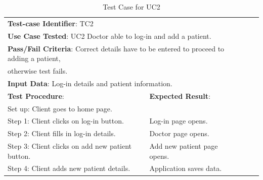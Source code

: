 \documentclass[a4paper]{article}
\begin{document}
\begin{table}[h!]
\centering
\caption*{Test Case for UC2}
\label{TC2}
\begin{tabular}{lllll}
\cline{1-2}

\multicolumn{2}{|l|}{\textbf{Test-case Identifier}: TC2}  &  &  &  \\

\multicolumn{2}{|l|}{\textbf{Use Case Tested}: UC2 Doctor able to log-in and add a patient.}  &  &  &  \\

\multicolumn{2}{|l|}{\textbf{Pass/Fail Criteria}: Correct details have to be entered to proceed to adding a patient,}  &  &  &  \\

\multicolumn{2}{|l|}{otherwise test fails.}  &  &  &  \\

\multicolumn{2}{|l|}{\textbf{Input Data}: Log-in details and patient information.}  &  &  &  \\

\cline{1-2}

\multicolumn{1}{|l|}{\textbf{Test Procedure}:} & \multicolumn{1}{l|}{\textbf{Expected Result}:} &  &  &  \\ 

\cline{1-2}

\multicolumn{1}{|l|}{Set up: Client goes to home page.} & \multicolumn{1}{l|}{} &  &  &  \\

\multicolumn{1}{|l|}{Step 1: Client clicks on log-in button.} & \multicolumn{1}{l|}{Log-in page opens.} &  &  &  \\

\multicolumn{1}{|l|}{Step 2: Client fills in log-in details.} & \multicolumn{1}{l|}{Doctor page opens.} &  &  &  \\

\multicolumn{1}{|l|}{Step 3: Client clicks on add new patient button.} & \multicolumn{1}{l|}{Add new patient page opens.} &  &  &  \\

\multicolumn{1}{|l|}{Step 4: Client adds new patient details.} & \multicolumn{1}{l|}{Application saves data.} &  &  &  \\

\cline{1-2}

\end{tabular}
\end{table}

\FloatBarrier
\end{document}
